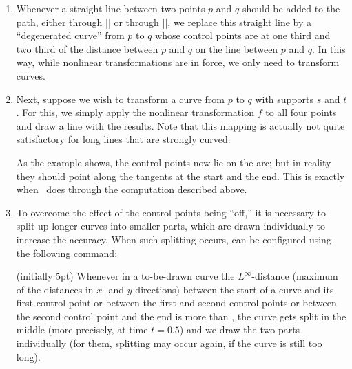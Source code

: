 \begin{enumerate}
\item Whenever a straight line between two points $p$ and $q$ should
  be added to the path, either through |\pgfpathlineto| or through
  |\pgfpathclose|, we replace this straight line by a ``degenerated
  curve'' from $p$ to $q$ whose control points are at one third and
  two third of the distance between $p$ and $q$ on the line between
  $p$ and $q$. In this way, while nonlinear transformations are in
  force, we only need to transform curves.
\item Next, suppose we wish to transform a curve from $p$ to $q$ with
  supports $s$ and $t$. For this, we simply apply the nonlinear
  transformation $f$ to all four points and draw a line with the
  results. Note that this mapping is actually not quite satisfactory
  for long lines that are strongly curved:
\begin{codeexample}[]
\end{codeexample}
  As the example shows, the control points now lie on the arc; but in
  reality they should point along the tangents at the start and the
  end. This is exactly when \pgfname\ does through the computation
  described above.
\item
  To overcome the effect of the control points being ``off,'' it is
  necessary to split up longer curves into smaller parts, which are
  drawn individually to increase the accuracy. When such splitting
  occurs, can be configured using the following command: 
  \begin{command}{\pgfsettransformnonlinearflatness{}
      (initially 5pt)}
    Whenever in a to-be-drawn curve the $L^\infty$-distance (maximum
    of the distances in $x$- and $y$-directions) between the start of
    a curve and its first control point or between the first and
    second control points or between the second control point and the
    end is more than , the curve gets split in the
    middle (more precisely, at time $t= 0.5$) and we draw the two
    parts individually (for them, splitting may occur again, if the
    curve is still too long).
\begin{codeexample}[]
\end{codeexample}
  \end{command}
\end{enumerate}


